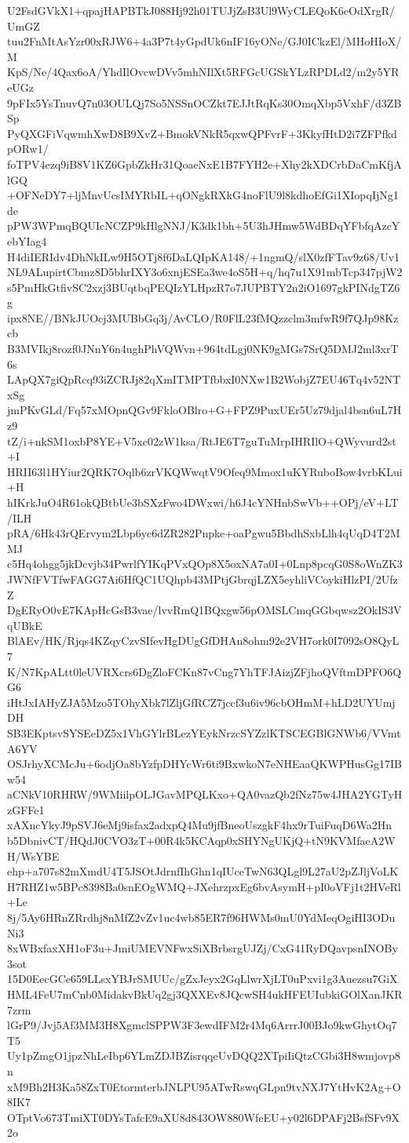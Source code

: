 U2FsdGVkX1+qpajHAPBTkJ088Hj92h01TUJjZsB3Ul9WyCLEQoK6eOdXrgR/UmGZ
tuu2FnMtAsYzr00xRJW6+4a3P7t4yGpdUk6nIF16yONe/GJ0ICkzEl/MHoHIoX/M
KpS/Ne/4Qax6oA/YhdIlOvcwDVv5mhNIlXt5RFGcUGSkYLzRPDLd2/m2y5YReUGz
9pFIx5YsTnuvQ7n03OULQj7So5NSSnOCZkt7EJJtRqKs30OmqXbp5VxhF/d3ZBSp
PyQXGFiVqwmhXwD8B9XvZ+BmokVNkR5qxwQPFvrF+3KkyfHtD2i7ZFPfkdpORw1/
foTPV4ezq9iB8V1KZ6GpbZkHr31QoaeNxE1B7FYH2e+Xhy2kXDCrbDaCmKfjAlGQ
+OFNeDY7+ljMnvUcsIMYRbIL+qONgkRXkG4noFlU9l8kdhoEfGi1XIopqIjNg1de
pPW3WPmqBQUIcNCZP9kHlgNNJ/K3dk1bh+5U3hJHmw5WdBDqYFbfqAzcYebYIag4
H4diIERIdv4DhNkILw9H5OTj8f6DaLQIpKA148/+1ngmQ/slX0zfFTav9z68/Uv1
NL9ALupirtCbmz8D5bhrIXY3o6xnjESEa3we4oS5H+q/hq7u1X91mbTcp347pjW2
s5PmHkGtfivSC2xzj3BUqtbqPEQIzYLHpzR7o7JUPBTY2n2iO1697gkPINdgTZ6g
ipx8NE//BNkJUOcj3MUBbGq3j/AvCLO/R0FlL23fMQzzclm3mfwR9f7QJp98Kzcb
B3MVIkj8rozf0JNnY6n4ughPhVQWvn+964tdLgj0NK9gMGs7SrQ5DMJ2ml3xrT6s
LApQX7giQpRcq93iZCRJj82qXmITMPTfbbxI0NXw1B2WobjZ7EU46Tq4v52NTxSg
jmPKvGLd/Fq57xMOpnQGv9FkloOBlro+G+FPZ9PuxUEr5Uz79djal4bsn6uL7Hz9
tZ/i+nkSM1oxbP8YE+V5xc02zW1ksa/RtJE6T7guTuMrpIHRIlO+QWyvurd2st+I
HRII63l1HYiur2QRK7Oqlb6zrVKQWwqtV9Ofeq9Mmox1uKYRuboBow4vrbKLui+H
hIKrkJuO4R61okQBtbUe3bSXzFwo4DWxwi/h6J4cYNHnbSwVb++OPj/eV+LT/ILH
pRA/6Hk43rQErvym2Lbp6yc6dZR282Pnpke+oaPgwu5BbdhSxbLlh4qUqD4T2MMJ
c5Hq4ohgg5jkDcvjb34PwrlfYIKqPVxQOp8X5oxNA7a0I+0Lnp8pcqG0S8oWnZK3
JWNfFVTfwFAGG7Ai6HfQC1UQhpb43MPtjGbrqjLZX5eyhliVCoykiHlzPI/2UfzZ
DgERyO0vE7KApHcGsB3vae/lvvRmQ1BQxgw56pOMSLCmqGGbqwsz2OkIS3VqUBkE
BlAEv/HK/Rjqs4KZqyCzvSIfevHgDUgGfDHAn8ohm92e2VH7ork0I7092sO8QyL7
K/N7KpALtt0leUVRXcrs6DgZloFCKn87vCng7YhTFJAizjZFjhoQVftmDPFO6QG6
iHtJxIAHyZJA5Mzo5TOhyXbk7lZljGfRCZ7jccf3u6iv96cbOHmM+hLD2UYUmjDH
SB3EKptsvSYSEeDZ5x1VhGYlrBLezYEykNrzcSYZzlKTSCEGBlGNWb6/VVmtA6YV
OSJrhyXCMcJu+6odjOa8bYzfpDHYcWr6ti9BxwkoN7eNHEaaQKWPHusGg17IBw54
aCNkV10RHRW/9WMiilpOLJGavMPQLKxo+QA0vazQb2fNz75w4JHA2YGTyHzGFFe1
xAXncYkyJ9pSVJ6eMj9isfax2adxpQ4Mu9jfBneoUszgkF4hx9rTuiFuqD6Wa2Hn
b5DbnivCT/HQdJ0CVO3zT+00R4k5KCAqp0xSHYNgUKjQ+tN9KVMfaeA2WH/WsYBE
ehp+a707s82mXmdU4T5JSOtJdrnfIhGhn1qIUceTwN63QLgl9L27aU2pZJljVoLK
H7RHZ1w5BPc8398Ba0snEOgWMQ+JXehrzpxEg6bvAsymH+pI0oVFj1t2HVeRl+Le
8j/5Ay6HRnZRrdhj8nMfZ2vZv1uc4wb85ER7f96HWMs0mU0YdMeqOgiHI3ODuNi3
8xWBxfaxXH1oF3u+JmiUMEVNFwxSiXBrbsrgUJZj/CxG41RyDQavpsnINOBy3sot
15D0EecGCe659LLsxYBJrSMUUc/gZxJeyx2GqLlwrXjLT0uPxvi1g3Auezsu7GiX
HML4FeU7mCnb0MidakvBkUq2gj3QXXEv8JQcwSH4ukHFEUIubkiGOlXanJKR7zrm
lGrP9/Jvj5Af3MM3H8XgmclSPPW3F3ewdIFM2r4Mq6ArrrJ00BJo9kwGhytOq7T5
Uy1pZmgO1jpzNhLeIbp6YLmZDJBZisrqqeUvDQQ2XTpiIiQtzCGbi3H8wmjovp8n
xM9Bh2H3Ka58ZxT0EtormterbJNLPU95ATwRswqGLpn9tvNXJ7YtHvK2Ag+O8IK7
OTptVo673TmiXT0DYsTafcE9aXU8d843OW880WfeEU+y02l6DPAFj2BsfSFv9X2o

